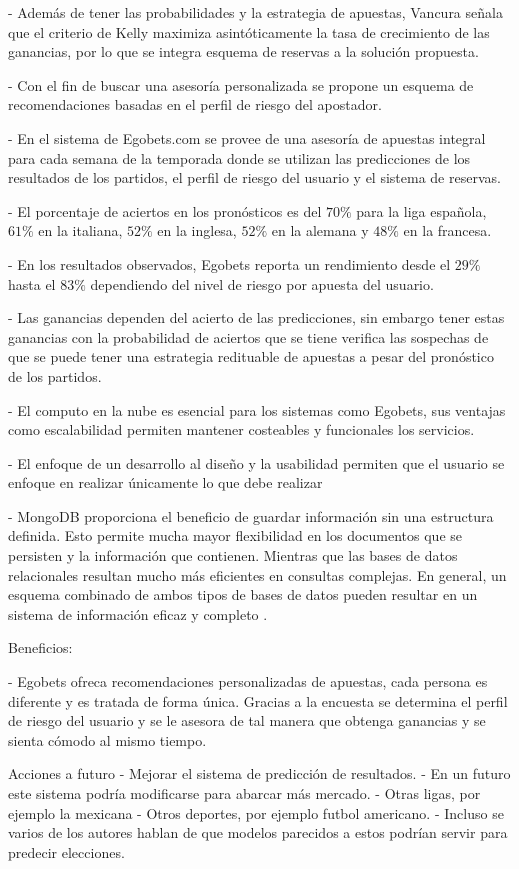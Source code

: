 - Además de tener las probabilidades y la estrategia de apuestas, Vancura \cite{vancura2000finding} señala que el criterio de Kelly \cite{kelly1956new} maximiza asintóticamente la tasa de crecimiento de las ganancias, por lo que se integra esquema de reservas a la solución propuesta.

- Con el fin de buscar una asesoría personalizada se propone un esquema de recomendaciones basadas en el perfil de riesgo del apostador.

- En el sistema de Egobets.com se provee de una asesoría de apuestas integral para cada semana de la temporada donde se utilizan las predicciones de los resultados de los partidos, el perfil de riesgo del usuario y el sistema de reservas.


- El porcentaje de aciertos en los pronósticos es del $70\%$ para la liga española, $61\%$ en la italiana, $52\%$ en la inglesa, $52\%$ en la alemana y $48\%$ en la francesa.


- En los resultados observados, Egobets reporta un rendimiento desde el $29\%$ hasta el $83\%$ dependiendo del nivel de riesgo por apuesta del usuario.

- Las ganancias dependen del acierto de las predicciones, sin embargo tener estas ganancias con la probabilidad de aciertos que se tiene verifica las sospechas de que se puede tener una estrategia redituable de apuestas a pesar del pronóstico de los partidos.

- El computo en la nube es esencial para los sistemas como Egobets, sus ventajas como escalabilidad permiten mantener costeables y funcionales los servicios.

- El enfoque de un desarrollo al diseño y la usabilidad permiten que el usuario se enfoque en realizar únicamente lo que debe realizar 

- MongoDB proporciona el beneficio de guardar información sin una estructura definida. Esto permite mucha mayor flexibilidad en los documentos que se persisten y la información que contienen\cite{puniaimplementing}. Mientras que las bases de datos relacionales resultan mucho más eficientes en consultas complejas. En general, un esquema combinado de ambos tipos de bases de datos pueden resultar en un sistema de información eficaz y completo \cite{faraj2014comparative}.


Beneficios:

- Egobets ofreca recomendaciones personalizadas de apuestas, cada persona es diferente y es tratada de forma única. Gracias a la encuesta se determina el perfil de riesgo del usuario y se le asesora de tal manera que obtenga ganancias y se sienta cómodo  al mismo tiempo.


Acciones a futuro
- Mejorar el sistema de predicción de resultados.
- En un futuro este sistema podría modificarse para abarcar más mercado.
	- Otras ligas, por ejemplo la mexicana
	- Otros deportes, por ejemplo futbol americano.
- Incluso se varios de los autores hablan de que modelos parecidos a estos podrían servir para predecir elecciones.


